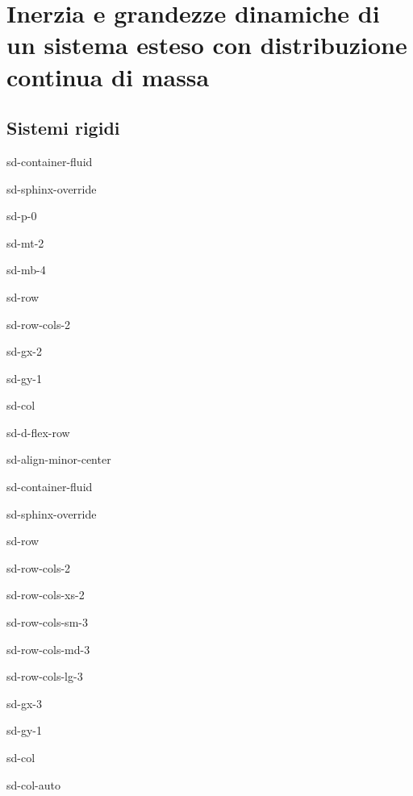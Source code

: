 \documentclass[letterpaper,10pt,italian]{jupyterBook}
\begin{document}
\section{Inerzia e grandezze dinamiche di un sistema esteso con distribuzione continua di massa}
\label{\detokenize{ch/mechanics/inertia-continuum:inerzia-e-grandezze-dinamiche-di-un-sistema-esteso-con-distribuzione-continua-di-massa}}\label{\detokenize{ch/mechanics/inertia-continuum::doc}}

\subsection{Sistemi rigidi}
\label{\detokenize{ch/mechanics/inertia-continuum:sistemi-rigidi}}
\sphinxstepscope

\begin{sphinxuseclass}{sd-container-fluid}
\begin{sphinxuseclass}{sd-sphinx-override}
\begin{sphinxuseclass}{sd-p-0}
\begin{sphinxuseclass}{sd-mt-2}
\begin{sphinxuseclass}{sd-mb-4}
\begin{sphinxuseclass}{sd-row}
\begin{sphinxuseclass}{sd-row-cols-2}
\begin{sphinxuseclass}{sd-gx-2}
\begin{sphinxuseclass}{sd-gy-1}
\begin{sphinxuseclass}{sd-col}
\begin{sphinxuseclass}{sd-d-flex-row}
\begin{sphinxuseclass}{sd-align-minor-center}
\begin{sphinxuseclass}{sd-container-fluid}
\begin{sphinxuseclass}{sd-sphinx-override}
\begin{sphinxuseclass}{sd-row}
\begin{sphinxuseclass}{sd-row-cols-2}
\begin{sphinxuseclass}{sd-row-cols-xs-2}
\begin{sphinxuseclass}{sd-row-cols-sm-3}
\begin{sphinxuseclass}{sd-row-cols-md-3}
\begin{sphinxuseclass}{sd-row-cols-lg-3}
\begin{sphinxuseclass}{sd-gx-3}
\begin{sphinxuseclass}{sd-gy-1}
\begin{sphinxuseclass}{sd-col}
\begin{sphinxuseclass}{sd-col-auto}

\end{sphinxuseclass}
\end{sphinxuseclass}
\end{sphinxuseclass}
\end{sphinxuseclass}
\end{sphinxuseclass}
\end{sphinxuseclass}
\end{sphinxuseclass}
\end{sphinxuseclass}
\end{sphinxuseclass}
\end{sphinxuseclass}
\end{sphinxuseclass}
\end{sphinxuseclass}
\end{sphinxuseclass}
\end{sphinxuseclass}
\end{sphinxuseclass}
\end{sphinxuseclass}
\end{sphinxuseclass}
\end{sphinxuseclass}
\end{sphinxuseclass}
\end{sphinxuseclass}
\end{sphinxuseclass}
\end{sphinxuseclass}
\end{sphinxuseclass}
\end{sphinxuseclass}
\end{document}
